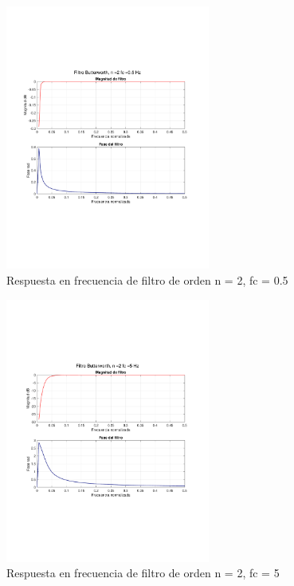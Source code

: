 		\begin{figure}[H]
			\center
			\includegraphics[width=0.6\textwidth,clip, trim = {1.9cm 6.8cm 2.3cm 7cm}]{../plots/1_c_filter_butter_2_freq_05.pdf}
			\caption{Respuesta en frecuencia de filtro de orden n = 2, fc = 0.5}
			\label{fig:1_c_n2_fc_05}
		\end{figure}

		\begin{figure}[H]
			\center
			\includegraphics[width=0.6\textwidth,clip, trim = {1.9cm 6.8cm 2.3cm 7cm}]{../plots/1_c_filter_butter_2_freq_5.pdf}
			\caption{Respuesta en frecuencia de filtro de orden n = 2, fc = 5}
			\label{fig:1_c_n2_fc_5}
		\end{figure}	

